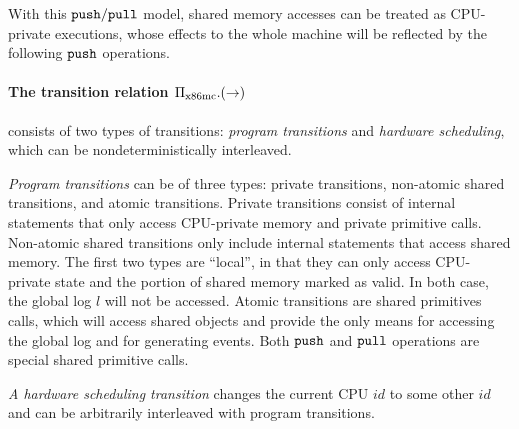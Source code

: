 With this ${\texttt{push}}/{\texttt{pull}}$ model, shared memory accesses
can be treated as CPU-private executions,
whose effects to the whole machine
will be reflected by the following ${\texttt{push}}$ operations. 

\paragraph{The transition relation $\Pi_{\text{x86mc}}.(\rightarrow)$}
consists of two types of transitions: 
\emph{program transitions} and \emph{hardware scheduling}, which can 
be nondeterministically interleaved.

\emph{Program transitions} can be of three types:
private transitions,
non-atomic shared transitions,
and atomic transitions.
Private transitions consist of
internal statements that only access
CPU-private memory
and  private primitive calls.
Non-atomic shared transitions
only include 
internal statements that access shared memory.
The first two types are ``local'', 
in that they can only access CPU-private 
state and the portion of shared memory marked as valid.
In both case, the global log $l$ will not be accessed.
Atomic transitions are
shared primitives calls, 
which will access shared objects
and provide the only means 
for accessing the global log and for generating events.
Both ${\texttt{push}}$ and ${\texttt{pull}}$ operations
are special shared primitive calls.

\emph{A hardware scheduling transition} changes the
current CPU $id$ to some other $id$ 
and  can be arbitrarily interleaved with
program transitions.

